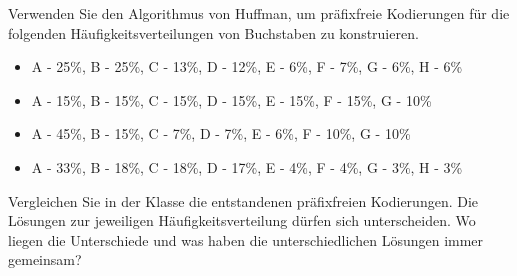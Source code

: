 \begin{myexercise}
	Verwenden Sie den Algorithmus von Huffman, um präfixfreie Kodierungen für die folgenden Häufigkeitsverteilungen von Buchstaben zu konstruieren.
	\begin{itemize}
		\item A - 25\%, B - 25\%, C - 13\%, D - 12\%, E - 6\%, F - 7\%, G - 6\%, H - 6\%
		\item A - 15\%, B - 15\%, C - 15\%, D - 15\%, E - 15\%, F - 15\%, G - 10\%
		\item A - 45\%, B - 15\%, C - 7\%, D - 7\%, E - 6\%, F - 10\%, G - 10\%
		\item A - 33\%, B - 18\%, C - 18\%, D - 17\%, E - 4\%, F - 4\%, G - 3\%, H - 3\%
	\end{itemize}
	Vergleichen Sie in der Klasse die entstandenen präfixfreien Kodierungen. Die Lösungen
	zur jeweiligen Häufigkeitsverteilung dürfen sich unterscheiden. Wo liegen die Unterschiede
	und was haben die unterschiedlichen Lösungen immer gemeinsam?


\end{myexercise}
